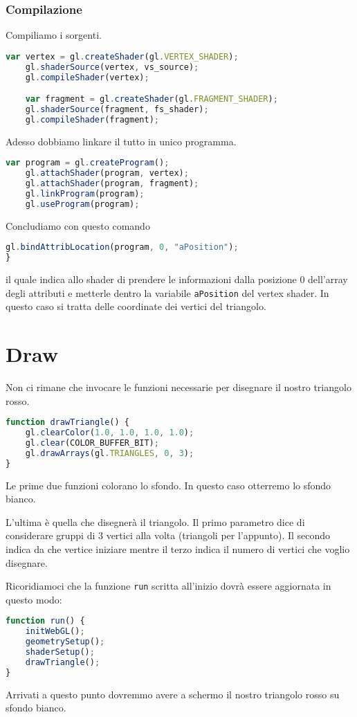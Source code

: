 \subsubsection{Compilazione}
Compiliamo i sorgenti.
\begin{lstlisting}[language=javascript, firstnumber=14]
	var vertex = gl.createShader(gl.VERTEX_SHADER);
	gl.shaderSource(vertex, vs_source);
	gl.compileShader(vertex);

	var fragment = gl.createShader(gl.FRAGMENT_SHADER);
	gl.shaderSource(fragment, fs_shader);
	gl.compileShader(fragment);
\end{lstlisting}
\newpage
Adesso dobbiamo linkare il tutto in unico programma.
\begin{lstlisting}[language=javascript, firstnumber=21]
	var program = gl.createProgram();
	gl.attachShader(program, vertex);
	gl.attachShader(program, fragment);
	gl.linkProgram(program);
	gl.useProgram(program);
\end{lstlisting}
Concludiamo con questo comando
\begin{lstlisting}[language=javascript, firstnumber=26]
	gl.bindAttribLocation(program, 0, "aPosition");
}
\end{lstlisting}
il quale indica allo shader di prendere le informazioni dalla posizione 0 dell'array degli
attributi e metterle dentro la variabile \verb|aPosition| del vertex shader. In questo caso
si tratta delle coordinate dei vertici del triangolo.

\section{Draw}
Non ci rimane che invocare le funzioni necessarie per disegnare il nostro triangolo rosso.
\begin{lstlisting}[language=javascript]
function drawTriangle() {
	gl.clearColor(1.0, 1.0, 1.0, 1.0);
	gl.clear(COLOR_BUFFER_BIT);
	gl.drawArrays(gl.TRIANGLES, 0, 3);
}
\end{lstlisting}
Le prime due funzioni colorano lo sfondo. In questo caso otterremo lo sfondo bianco.

L'ultima \`e quella che disegner\`a il triangolo. Il primo parametro dice di considerare
gruppi di 3 vertici alla volta (triangoli per l'appunto). Il secondo indica da che vertice
iniziare mentre il terzo indica il numero di vertici che voglio disegnare.

Ricoridiamoci che la funzione \verb|run| scritta all'inizio dovr\`a essere aggiornata
in questo modo:
\begin{lstlisting}[language=javascript]
function run() {
	initWebGL();
	geometrySetup();
	shaderSetup();
	drawTriangle();
}
\end{lstlisting}
Arrivati a questo punto dovremmo avere a schermo il nostro triangolo rosso su sfondo bianco.

